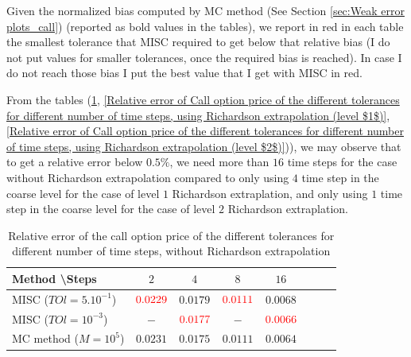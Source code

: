 \documentclass[11pt]{article}
\begin{document}
Given the normalized bias computed by MC method (See Section \ref{sec:Weak error plots_call}) (reported as bold values in the tables), we report in red in each table the smallest tolerance that MISC required to get below that relative bias (I do not put values for smaller tolerances, once the required bias is reached). In case I do not reach those bias I put the best value that I get with MISC in red.

From the tables (\ref{Relative error of the call option price of the different tolerances for different number of time steps.}, \ref{Relative error of Call option price of the different tolerances for different number of time steps, using Richardson extrapolation (level $1$)}, \ref{Relative error of Call option price of the different tolerances for different number of time steps, using Richardson extrapolation (level $2$)})), we may observe that to get a relative error below $0.5\%$, we need more than $16$ time steps for the case without Richardson extrapolation compared to only using $4$ time step in the coarse level for the case of level $1$ Richardson extraplation,  and  only using $1$ time step in the coarse level for the case of level $2$ Richardson extraplation.

\begin{table}[h!]
	\centering
	\begin{tabular}{l*{6}{c}r}
		Method \textbackslash  Steps            & $2$ & $4$ & $8$ & $16$ &   \\
		\hline
		MISC ($TOl=5.10^{-1}$)  & $ {\color{red}0.0229}$ & $  0.0179$ & ${\color{red}0.0111}$ & $ 0.0068$  \\
		MISC ($TOl=10^{-3}$)  & $-$ & $ {\color{red} 0.0177}$ & $-$ & ${\color{red}  0.0066}$  \\
			MC method ($M=10^{5}$)&$ \mathbf{0.0231}$    & $\mathbf{0.0175}$  & $\mathbf{0.0111}$  & $\mathbf{0.0064}$ \\	
		\hline
	\end{tabular}
	\caption{Relative error of the call option price of the different tolerances for different number of time steps, without Richardson extrapolation}
	\label{Relative error of the call option price of the different tolerances for different number of time steps.}
\end{table}
\end{document}
